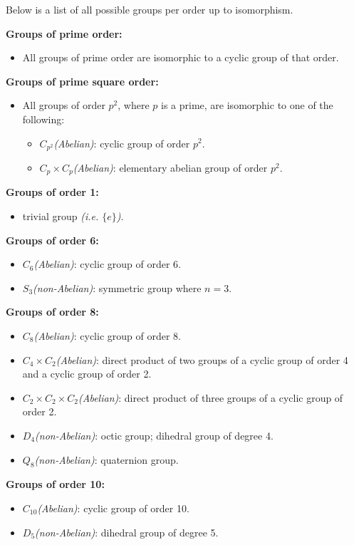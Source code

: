 \documentclass[12pt]{article}
\begin{document}

Below is a list of all possible groups per order up to isomorphism.

\textbf{Groups of prime order:}
\begin{itemize}
\item All groups of prime order are isomorphic to a cyclic group of that order.
\end{itemize}

\textbf{Groups of prime square order:}
\begin{itemize}
\item All groups of order $p^2$, where $p$ is a prime, are isomorphic to one of the following:
\begin{itemize}
\item $C_{p^2}$\textit{(Abelian)}: cyclic group of order $p^2$.
\item $C_p\times C_p$\textit{(Abelian)}: elementary abelian group of order $p^2$.
\end{itemize}
\end{itemize}

\textbf{Groups of order 1:}
\begin{itemize}
\item trivial group \textit{(i.e. $\{ e\}$)}.
\end{itemize}

\textbf{Groups of order 6:}
\begin{itemize}
\item $C_6$\textit{(Abelian)}: cyclic group of order 6.
\item $S_3$\textit{(non-Abelian)}: symmetric group where $n=3$.
\end{itemize}

\textbf{Groups of order 8:}
\begin{itemize}
\item $C_8$\textit{(Abelian)}: cyclic group of order 8.
\item $C_4\times C_2$\textit{(Abelian)}: direct product of two groups of a cyclic group of order 4 and a cyclic group of order 2.
\item $C_2\times C_2\times C_2$\textit{(Abelian)}: direct product of three groups of a cyclic group of order 2.
\item $D_4$\textit{(non-Abelian)}: octic group; dihedral group of degree 4.
\item $Q_8$\textit{(non-Abelian)}: quaternion group.
\end{itemize}

\textbf{Groups of order 10:}
\begin{itemize}
\item $C_{10}$\textit{(Abelian)}: cyclic group of order 10.
\item $D_5$\textit{(non-Abelian)}: dihedral group of degree 5.
\end{itemize}
\end{document}
